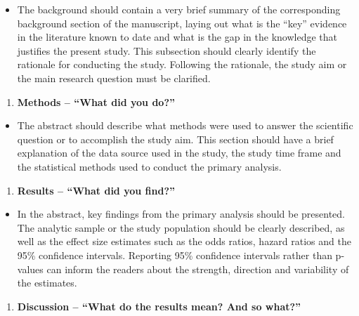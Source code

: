 \documentclass[
]{book}
\providecommand{\tightlist}{%
  \setlength{\itemsep}{0pt}\setlength{\parskip}{0pt}}
\begin{document}
\begin{itemize}
\tightlist
\item
  The background should contain a very brief summary of the corresponding background section of the manuscript, laying out what is the ``key'' evidence in the literature known to date and what is the gap in the knowledge that justifies the present study. This subsection should clearly identify the rationale for conducting the study. Following the rationale, the study aim or the main research question must be clarified.
\end{itemize}

\begin{enumerate}
\def\labelenumi{\arabic{enumi}.}
\setcounter{enumi}{1}
\tightlist
\item
  \textbf{Methods -- ``What did you do?''}
\end{enumerate}

\begin{itemize}
\tightlist
\item
  The abstract should describe what methods were used to answer the scientific question or to accomplish the study aim. This section should have a brief explanation of the data source used in the study, the study time frame and the statistical methods used to conduct the primary analysis.
\end{itemize}

\begin{enumerate}
\def\labelenumi{\arabic{enumi}.}
\setcounter{enumi}{2}
\tightlist
\item
  \textbf{Results -- ``What did you find?''}
\end{enumerate}

\begin{itemize}
\tightlist
\item
  In the abstract, key findings from the primary analysis should be presented. The analytic sample or the study population should be clearly described, as well as the effect size estimates such as the odds ratios, hazard ratios and the 95\% confidence intervals. Reporting 95\% confidence intervals rather than p-values can inform the readers about the strength, direction and variability of the estimates.
\end{itemize}

\begin{enumerate}
\def\labelenumi{\arabic{enumi}.}
\setcounter{enumi}{3}
\tightlist
\item
  \textbf{Discussion -- ``What do the results mean? And so what?''}
\end{enumerate}
\end{document}
